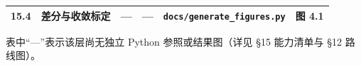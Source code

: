 \documentclass[
]{ctexbook}
\begin{document}
\begin{longtable}[]{@{}llllll@{}}
\begin{minipage}[t]{0.14\columnwidth}
15.4\strut
\end{minipage} & \begin{minipage}[t]{0.14\columnwidth}\raggedright
差分与收敛标定\strut
\end{minipage} & \begin{minipage}[t]{0.14\columnwidth}\raggedright
---\strut
\end{minipage} & \begin{minipage}[t]{0.14\columnwidth}\raggedright
---\strut
\end{minipage} & \begin{minipage}[t]{0.14\columnwidth}\raggedright
\texttt{docs/generate\_figures.py}\strut
\end{minipage} & \begin{minipage}[t]{0.14\columnwidth}\raggedright
图 4.1\strut
\end{minipage}\tabularnewline
\bottomrule
\end{longtable}

表中``---''表示该层尚无独立 Python 参照或结果图（详见 §15 能力清单与 §12
路线图）。
\end{document}
